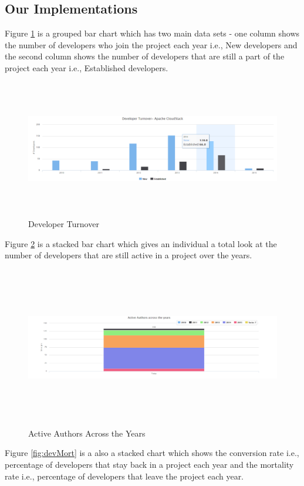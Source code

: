 \documentclass[seploa]{beavtex}
\begin{document}
\subsection{Our Implementations}
Figure \ref{fig:devTurn} is a grouped bar chart which has two main data sets - one column shows the number of developers who join the project each year i.e., New developers and the second column shows the number of developers that are still a part of the project each year i.e., Established developers.

\begin{figure}[H]
\centering
\includegraphics[width=130mm,height=60mm]{image1.PNG}
\caption{Developer Turnover}
\label{fig:devTurn}
\end{figure}

Figure \ref{fig:actAuth} is a stacked bar chart which gives an individual a total look at the number of developers that are still active in a project over the years.

\begin{figure}[H]
\centering
\includegraphics[width=170mm,height=70mm]{image2.PNG}
\caption{Active Authors Across the Years}
\label{fig:actAuth}
\end{figure}

Figure \ref{fig:devMort} is a also a stacked chart which shows the conversion rate i.e., percentage of developers that stay back in a project each year and the mortality rate i.e., percentage of developers that leave the project each year.
\end{document}
